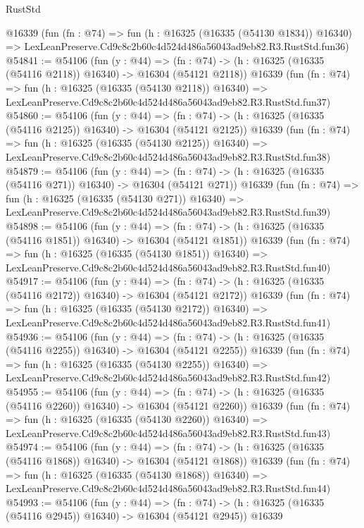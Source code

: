\begin{lexlean}{RustStd}
\begin{coremodule}
    @16339
    (fun (fn : @74) =>
    fun (h : @16325 (@16335 (@54130 @1834)) @16340) =>
    LexLeanPreserve.Cd9c8c2b60c4d524d486a56043ad9eb82.R3.RustStd.fun36)
@54841 := @54106
    (fun (y : @44) =>
    (fn : @74) -> (h : @16325 (@16335 (@54116 @2118)) @16340) -> @16304 (@54121 @2118))
    @16339
    (fun (fn : @74) =>
    fun (h : @16325 (@16335 (@54130 @2118)) @16340) =>
    LexLeanPreserve.Cd9c8c2b60c4d524d486a56043ad9eb82.R3.RustStd.fun37)
@54860 := @54106
    (fun (y : @44) =>
    (fn : @74) -> (h : @16325 (@16335 (@54116 @2125)) @16340) -> @16304 (@54121 @2125))
    @16339
    (fun (fn : @74) =>
    fun (h : @16325 (@16335 (@54130 @2125)) @16340) =>
    LexLeanPreserve.Cd9c8c2b60c4d524d486a56043ad9eb82.R3.RustStd.fun38)
@54879 := @54106
    (fun (y : @44) =>
    (fn : @74) -> (h : @16325 (@16335 (@54116 @271)) @16340) -> @16304 (@54121 @271))
    @16339
    (fun (fn : @74) =>
    fun (h : @16325 (@16335 (@54130 @271)) @16340) =>
    LexLeanPreserve.Cd9c8c2b60c4d524d486a56043ad9eb82.R3.RustStd.fun39)
@54898 := @54106
    (fun (y : @44) =>
    (fn : @74) -> (h : @16325 (@16335 (@54116 @1851)) @16340) -> @16304 (@54121 @1851))
    @16339
    (fun (fn : @74) =>
    fun (h : @16325 (@16335 (@54130 @1851)) @16340) =>
    LexLeanPreserve.Cd9c8c2b60c4d524d486a56043ad9eb82.R3.RustStd.fun40)
@54917 := @54106
    (fun (y : @44) =>
    (fn : @74) -> (h : @16325 (@16335 (@54116 @2172)) @16340) -> @16304 (@54121 @2172))
    @16339
    (fun (fn : @74) =>
    fun (h : @16325 (@16335 (@54130 @2172)) @16340) =>
    LexLeanPreserve.Cd9c8c2b60c4d524d486a56043ad9eb82.R3.RustStd.fun41)
@54936 := @54106
    (fun (y : @44) =>
    (fn : @74) -> (h : @16325 (@16335 (@54116 @2255)) @16340) -> @16304 (@54121 @2255))
    @16339
    (fun (fn : @74) =>
    fun (h : @16325 (@16335 (@54130 @2255)) @16340) =>
    LexLeanPreserve.Cd9c8c2b60c4d524d486a56043ad9eb82.R3.RustStd.fun42)
@54955 := @54106
    (fun (y : @44) =>
    (fn : @74) -> (h : @16325 (@16335 (@54116 @2260)) @16340) -> @16304 (@54121 @2260))
    @16339
    (fun (fn : @74) =>
    fun (h : @16325 (@16335 (@54130 @2260)) @16340) =>
    LexLeanPreserve.Cd9c8c2b60c4d524d486a56043ad9eb82.R3.RustStd.fun43)
@54974 := @54106
    (fun (y : @44) =>
    (fn : @74) -> (h : @16325 (@16335 (@54116 @1868)) @16340) -> @16304 (@54121 @1868))
    @16339
    (fun (fn : @74) =>
    fun (h : @16325 (@16335 (@54130 @1868)) @16340) =>
    LexLeanPreserve.Cd9c8c2b60c4d524d486a56043ad9eb82.R3.RustStd.fun44)
@54993 := @54106
    (fun (y : @44) =>
    (fn : @74) -> (h : @16325 (@16335 (@54116 @2945)) @16340) -> @16304 (@54121 @2945))
    @16339

\end{coremodule}
\end{lexlean}
